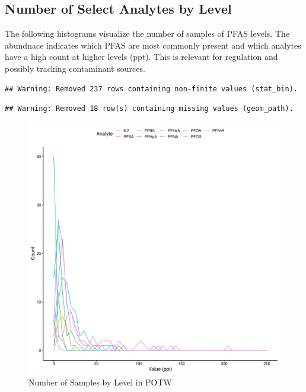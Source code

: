 \documentclass[
  12pt,
]{article}
\begin{document}
\hypertarget{number-of-select-analytes-by-level}{%
\subsection{Number of Select Analytes by
Level}\label{number-of-select-analytes-by-level}}

The following histograms visualize the number of samples of PFAS levels.
The abundnace indicates which PFAS are most commonly present and which
analytes have a high count at higher levels (ppt). This is relevant for
regulation and possibly tracking contaminant sources.

\begin{verbatim}
## Warning: Removed 237 rows containing non-finite values (stat_bin).
\end{verbatim}

\begin{verbatim}
## Warning: Removed 18 row(s) containing missing values (geom_path).
\end{verbatim}

\begin{figure}

\includegraphics{PFAS_FinalProject_files/figure-latex/unnamed-chunk-4-1} \hfill{}

\caption{Number of Samples by Level in POTW}\label{fig:unnamed-chunk-4}
\end{figure}
\end{document}
